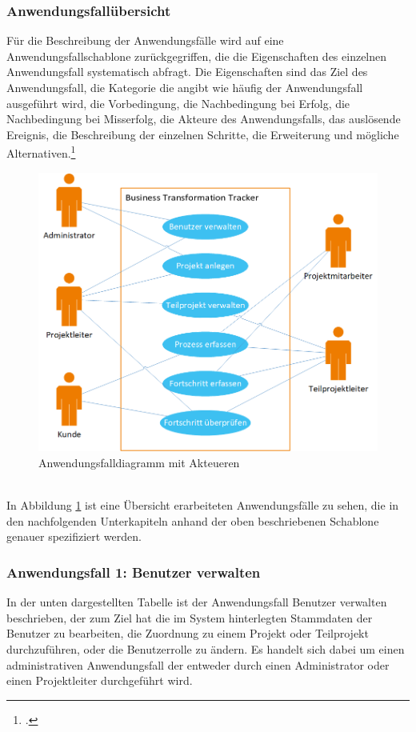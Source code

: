 \subsubsection{Anwendungsfallübersicht}
Für die Beschreibung der Anwendungsfälle wird auf eine Anwendungsfallschablone zurückgegriffen, die die Eigenschaften des einzelnen Anwendungsfall systematisch abfragt. Die Eigenschaften sind das Ziel des Anwendungsfall, die Kategorie die angibt wie häufig der Anwendungsfall ausgeführt wird, die Vorbedingung, die Nachbedingung bei Erfolg, die Nachbedingung bei Misserfolg, die Akteure des Anwendungsfalls, das auslösende Ereignis, die Beschreibung der einzelnen Schritte, die Erweiterung und mögliche Alternativen.\footcite[Vgl.][S. 261]{balzert}
\begin{figure}[h]
    \centering
    \includegraphics[scale=0.67]{./Bilder/Anwendungsfalldiagramm.png}
    \caption[Anwendungsfalldiagramm]{Anwendungsfalldiagramm mit Akteueren}
    \label{fig:Anwendungsfalldiagramm}
\end{figure}
\\In Abbildung \ref{fig:Anwendungsfalldiagramm} ist eine Übersicht erarbeiteten Anwendungsfälle zu sehen, die in den nachfolgenden Unterkapiteln anhand der oben beschriebenen Schablone genauer spezifiziert werden.

\newpage
\subsubsection{Anwendungsfall 1: Benutzer verwalten}
In der unten dargestellten Tabelle ist der Anwendungsfall \glqq{}Benutzer verwalten\grqq{} beschrieben, der zum Ziel hat die im System hinterlegten Stammdaten der Benutzer zu bearbeiten, die Zuordnung zu einem Projekt oder Teilprojekt durchzuführen, oder die Benutzerrolle zu ändern. Es handelt sich dabei um einen administrativen Anwendungsfall der entweder durch einen Administrator oder einen Projektleiter durchgeführt wird.\\

